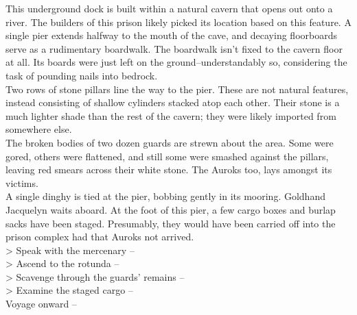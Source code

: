 This underground dock is built within a natural cavern that opens out onto a river. The builders of this prison likely picked its location based on this feature. A single pier extends halfway to the mouth of the cave, and decaying floorboards serve as a rudimentary boardwalk. The boardwalk isn’t fixed to the cavern floor at all. Its boards were just left on the ground--understandably so, considering the task of pounding nails into bedrock.\\

Two rows of stone pillars line the way to the pier. These are not natural features, instead consisting of shallow cylinders stacked atop each other. Their stone is a much lighter shade than the rest of the cavern; they were likely imported from somewhere else.\\

The broken bodies of two dozen guards are strewn about the area. Some were gored, others were flattened, and still some were smashed against the pillars, leaving red smears across their white stone. The Auroks too, lays amongst its victims.\\

A single dinghy is tied at the pier, bobbing gently in its mooring. Goldhand Jacquelyn waits aboard. At the foot of this pier, a few cargo boxes and burlap sacks have been staged. Presumably, they would have been carried off into the prison complex had that Auroks not arrived.\\

> Speak with the mercenary -- \\
> Ascend to the rotunda -- \\
> Scavenge through the guards’ remains -- \\
> Examine the staged cargo -- \\
 Voyage onward -- 